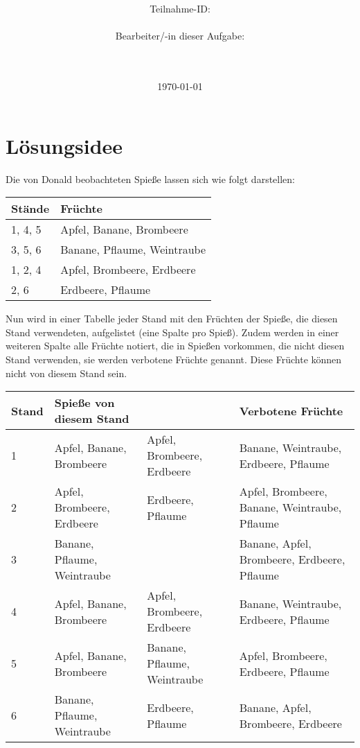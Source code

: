 \documentclass[a4paper,10pt,ngerman]{scrartcl}
\title{\textbf{\Huge\Aufgabe}}
\author{\LARGE Teilnahme-ID: \LARGE \TeilnahmeId \\\\
	    \LARGE Bearbeiter/-in dieser Aufgabe: \\ 
	    \LARGE \Name\\\\}
\date{\LARGE\today}
\begin{document}
\maketitle
\tableofcontents

\vspace{0.5cm}

\section{Lösungsidee}

Die von Donald beobachteten Spieße lassen sich wie folgt darstellen:

\begin{center}
\begin{tabular}{l|l}
    \textbf{Stände} & \textbf{Früchte} \\
    \hline
    1, 4, 5 & Apfel, Banane, Brombeere \\
    3, 5, 6 & Banane, Pflaume, Weintraube \\
    1, 2, 4 & Apfel, Brombeere, Erdbeere \\
    2, 6 & Erdbeere, Pflaume
\end{tabular}
\end{center}

Nun wird in einer Tabelle jeder Stand mit den Früchten der Spieße, die diesen Stand verwendeten, aufgelistet (eine Spalte pro Spieß).
Zudem werden in einer weiteren Spalte alle Früchte notiert, die in Spießen vorkommen, die nicht diesen Stand verwenden, sie werden verbotene Früchte genannt.
Diese Früchte können nicht von diesem Stand sein.

\begin{center}
\begin{tabularx}{\linewidth}{l|X|X|X}
    \textbf{Stand} & \textbf{Spieße von diesem Stand} & & \textbf{Verbotene Früchte} \\
    \hline
    1 & Apfel, Banane, Brombeere & Apfel, Brombeere, Erdbeere & Banane, Weintraube, Erdbeere, Pflaume \\
    \hline
    2 & Apfel, Brombeere, Erdbeere & Erdbeere, Pflaume & Apfel, Brombeere, Banane, Weintraube, Pflaume \\
    \hline
    3 & Banane, Pflaume, Weintraube & & Banane, Apfel, Brombeere, Erdbeere, Pflaume \\
    \hline
    4 & Apfel, Banane, Brombeere & Apfel, Brombeere, Erdbeere & Banane, Weintraube, Erdbeere, Pflaume \\
    \hline
    5 & Apfel, Banane, Brombeere & Banane, Pflaume, Weintraube & Apfel, Brombeere, Erdbeere, Pflaume \\
    \hline
    6 & Banane, Pflaume, Weintraube & Erdbeere, Pflaume & Banane, Apfel, Brombeere, Erdbeere
\end{tabularx}
\end{center}
\end{document}
